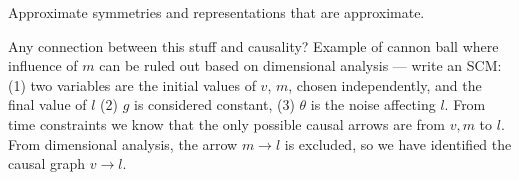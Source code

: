 \documentclass{article}
\renewcommand{\paragraph}[1]{\par\textbf{#1}~---~}
\begin{document}
Approximate symmetries and representations that are approximate.

Any connection between this stuff and causality?
Example of cannon ball where influence of $m$ can be ruled out based on dimensional analysis --- write an SCM: (1) two variables are the initial values of $v$, $m$, chosen independently, and the final value of $l$ (2) $g$ is considered constant, (3) $\theta$ is the noise affecting $l$. From time constraints we know that the only possible causal arrows are from $v, m$ to $l$. From dimensional analysis, the arrow $m\to l$ is excluded, so we have identified the causal graph $v\to l$.



\raggedright

\end{document}
